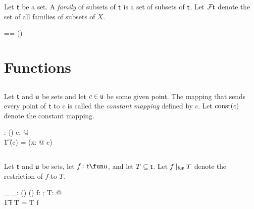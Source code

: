 \documentclass[11pt, oneside]{article}
\begin{document}
Let $\mathsf{t}$ be a set.
A {\it family} of subsets of $\mathsf{t}$ is a set of subsets of $\mathsf{t}$.
Let $\mathcal{F} \mathsf{t}$ denote the set of all families of subsets of $X$.

\begin{zed}
	\family \genT == \power(\power \genT)
\end{zed}

\section{Functions}


\subsection{}

Let $\mathsf{t}$ and $\mathsf{u}$ be sets and let $c \in \mathsf{u}$ be some given point.
The mapping that sends every point of $\mathsf{t}$ to $c$ is called the {\it constant mapping} defined by $c$.
Let $\operatorname{const}(c)$ denote the constant mapping.

\begin{gendef}[\genT, \genU]
	\const: \genU \fun (\genT \fun \genU)
\where
	\forall c: \genU @ \\
	\t1	\const(c) = (\lambda x: \genT @ c)
\end{gendef}


\subsection{}

Let $\mathsf{t}$ and $\mathsf{u}$ be sets, let $f: \genT \fun \genU$, and let $T \subseteq \mathsf{t}$.
Let $f \mathbin{|_{\mathsf{fun}}} T$ denote the restriction of $f$ to $T$.

\begin{gendef}[\genT, \genU]
	\_ \restrictU \_: (\genT \fun \genU) \cross \power \genT \fun (\genT \pfun \genU)
\where
	\forall f: \genT \fun \genU; T: \power \genT @ \\
	\t1	f \restrictU T = T \dres f
\end{gendef}

\printbibliography
\end{document}

